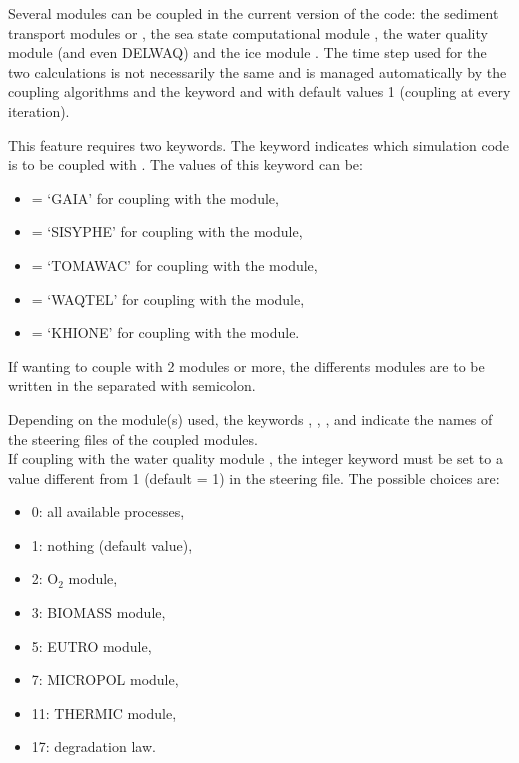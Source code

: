 Several modules can be coupled in the current version of the code:
the sediment transport modules \gaia or \sisyphe,
the sea state computational module \tomawac,
the water quality module \waqtel (and even DELWAQ)
and the ice module \khione.
The time step used for the two calculations is not necessarily the same and is
managed automatically by the coupling algorithms
and the keyword  and
 with default values 1
(coupling at every iteration).

This feature requires two keywords.
The keyword  indicates which simulation code is to be
coupled with .
The values of this keyword can be:

\begin{itemize}
\item {} = `GAIA' for coupling with the \gaia module,

\item {} = `SISYPHE' for coupling with the \sisyphe module,

\item {} = `TOMAWAC' for coupling with the \tomawac module,

\item {} = `WAQTEL' for coupling with the \waqtel module,

\item {} = `KHIONE' for coupling with the \khione module.

\end{itemize}

If wanting to couple with 2 modules or more, the differents modules are to
be written in the  separated with semicolon.

Depending on the module(s) used, the keywords
, ,
, 
and 
indicate the names of the steering files
of the coupled modules.\\

If coupling with the water quality module \waqtel, the integer keyword
 must be set to a value different from 1
(default = 1) in the  steering file.
The possible choices are:
\begin{itemize}
\item 0: all available processes,
\item 1: nothing (default value),
\item 2: O$_2$ module,
\item 3: BIOMASS module,
\item 5: EUTRO module,
\item 7: MICROPOL module,
\item 11: THERMIC module,
\item 17: degradation law.
\end{itemize}

